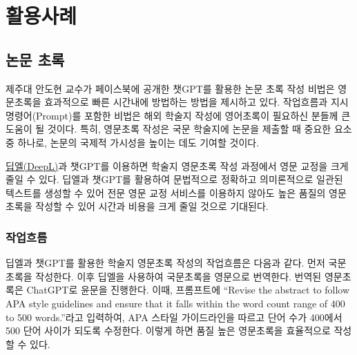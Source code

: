 \documentclass[
  letterpaper,
]{book}
\begin{document}
\hypertarget{uxd65cuxc6a9uxc0acuxb840}{%
\chapter{활용사례}\label{uxd65cuxc6a9uxc0acuxb840}}

\hypertarget{uxb17cuxbb38-uxcd08uxb85d}{%
\section{논문 초록}\label{uxb17cuxbb38-uxcd08uxb85d}}

제주대 안도현 교수가 페이스북에 공개한 챗GPT를 활용한 논문 초록 작성
비법은 영문초록을 효과적으로 빠른 시간내에 방법하는 방법을 제시하고
있다. 작업흐름과 지시명령어(Prompt)를 포함한 비법은 해외 학술지 작성에
영어초록이 필요하신 분들께 큰 도움이 될 것이다. 특히, 영문초록 작성은
국문 학술지에 논문을 제출할 때 중요한 요소 중 하나로, 논문의 국제적
가시성을 높이는 데도 기여할 것이다.

\href{https://www.deepl.com}{딥엘(DeepL)}과 챗GPT를 이용하면 학술지
영문초록 작성 과정에서 영문 교정을 크게 줄일 수 있다. 딥엘과 챗GPT를
활용하여 문법적으로 정확하고 의미론적으로 일관된 텍스트를 생성할 수 있어
전문 영문 교정 서비스를 이용하지 않아도 높은 품질의 영문초록을 작성할 수
있어 시간과 비용을 크게 줄일 것으로 기대된다.

\hypertarget{uxc791uxc5c5uxd750uxb984-2}{%
\subsection{작업흐름}\label{uxc791uxc5c5uxd750uxb984-2}}

딥엘과 챗GPT를 활용한 학술지 영문초록 작성의 작업흐름은 다음과 같다.
먼저 국문초록을 작성한다. 이후 딥엘을 사용하여 국문초록을 영문으로
번역한다. 번역된 영문초록은 ChatGPT로 윤문을 진행한다. 이때, 프롬프트에
``Revise the abstract to follow APA style guidelines and ensure that it
falls within the word count range of 400 to 500 words.''라고 입력하여,
APA 스타일 가이드라인을 따르고 단어 수가 400에서 500 단어 사이가 되도록
수정한다. 이렇게 하면 품질 높은 영문초록을 효율적으로 작성할 수 있다.
\end{document}
